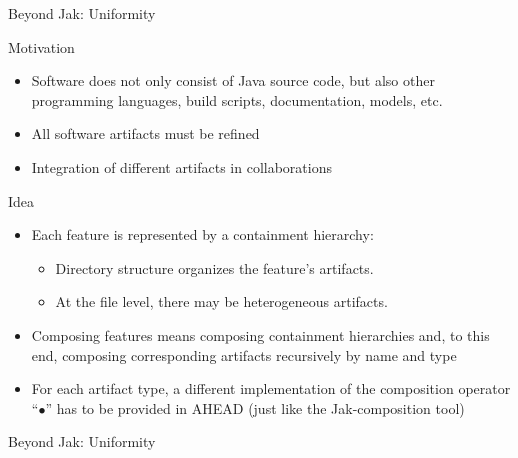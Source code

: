 \begin{frame}{Beyond Jak: Uniformity}
	\begin{mycolumns}[widths={35,65},animation=none]
		\begin{note}{Motivation}
			\begin{itemize}
				\item Software does not only consist of Java source code, but also other programming languages, build scripts, documentation, models, etc.
				\item All software artifacts must be refined 
				\item Integration of different artifacts in collaborations
			\end{itemize}
		\end{note}
	\mynextcolumn
		\begin{definition}{Idea}
			\begin{itemize}
				\item Each feature is represented by a containment hierarchy: 
				\begin{itemize}
					\item Directory structure organizes the feature's artifacts.
					\item At the file level, there may be heterogeneous artifacts.
				\end{itemize}
				\item Composing features means composing containment hierarchies and, to this end, composing corresponding artifacts recursively by name and type
				\item For each artifact type, a different implementation of the composition operator ``$\bullet$'' has to be provided in AHEAD (just like the Jak-composition tool)
			\end{itemize}
		\end{definition}
	\end{mycolumns}
\end{frame}

\begin{frame}{Beyond Jak: Uniformity}
	\begin{exampletight}{}
		\centering
	\end{exampletight}
\end{frame}

